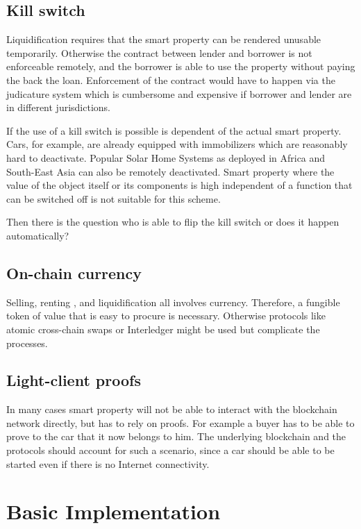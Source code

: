 \subsection{Kill switch}

Liquidification requires that the smart property can be rendered unusable temporarily. Otherwise the contract between lender and borrower is not enforceable remotely, and the borrower is able to use the property without paying the back the loan. Enforcement of the contract would have to happen via the judicature system which is cumbersome and expensive if borrower and lender are in different jurisdictions. 

If the use of a kill switch is possible is dependent of the actual smart property. Cars, for example, are already equipped with immobilizers which are reasonably hard to deactivate. Popular Solar Home Systems as deployed in Africa and South-East Asia can also be remotely deactivated. Smart property where the value of the object itself or its components is high independent of a function that can be switched off is not suitable for this scheme. 

Then there is the question who is able to flip the kill switch or does it happen automatically?

\subsection{On-chain currency}
Selling, renting , and liquidification all involves currency. Therefore, a fungible token of value that is easy to procure is necessary. 
Otherwise protocols like atomic cross-chain swaps or Interledger might be used but complicate the processes.

\subsection{Light-client proofs}

In many cases smart property will not be able to interact with the blockchain network directly, but has to rely on proofs. For example a buyer has to be able to prove to the car that it now belongs to him. The underlying blockchain and the protocols should account for such a scenario, since a car should be able to be started even if there is no Internet connectivity. 


\section{Basic Implementation}

